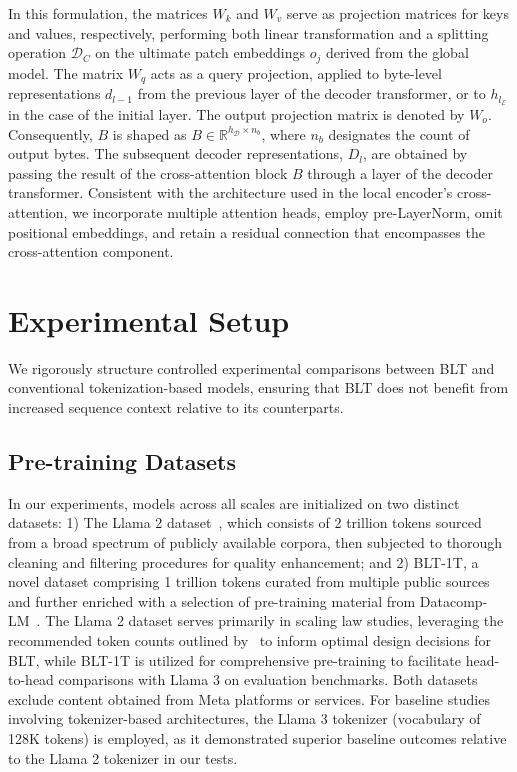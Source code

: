 In this formulation, the matrices $W_k$ and $W_v$ serve as projection matrices for keys and values, respectively, performing both linear transformation and a splitting operation $\mathcal{D}_C$ on the ultimate patch embeddings $o_j$ derived from the global model. The matrix $W_q$ acts as a query projection, applied to byte-level representations $d_{l-1}$ from the previous layer of the decoder transformer, or to $h_{l_{\mathcal{E}}}$ in the case of the initial layer. The output projection matrix is denoted by $W_o$. Consequently, $B$ is shaped as $B \in \mathbb{R}^{h_{\mathcal{D}} \times n_b}$, where $n_b$ designates the count of output bytes. The subsequent decoder representations, $D_l$, are obtained by passing the result of the cross-attention block $B$ through a layer of the decoder transformer. Consistent with the architecture used in the local encoder's cross-attention, we incorporate multiple attention heads, employ pre-LayerNorm, omit positional embeddings, and retain a residual connection that encompasses the cross-attention component.

\section{Experimental Setup}
\label{section:experiments}
We rigorously structure controlled experimental comparisons between {\textsc BLT} and conventional tokenization-based models, ensuring that {\textsc BLT} does not benefit from increased sequence context relative to its counterparts.

\subsection{Pre-training Datasets} In our experiments, models across all scales are initialized on two distinct datasets: 1) The Llama 2 dataset~\citep{touvron2023llama}, which consists of 2 trillion tokens sourced from a broad spectrum of publicly available corpora, then subjected to thorough cleaning and filtering procedures for quality enhancement; and 2) {\textsc BLT}-1T, a novel dataset comprising 1 trillion tokens curated from multiple public sources and further enriched with a selection of pre-training material from Datacomp-LM~\citep{li2024datacomp}. The Llama 2 dataset serves primarily in scaling law studies, leveraging the recommended token counts outlined by~\cite{dubey2024llama} to inform optimal design decisions for {\textsc BLT}, while {\textsc BLT}-1T is utilized for comprehensive pre-training to facilitate head-to-head comparisons with Llama 3 on evaluation benchmarks. Both datasets exclude content obtained from Meta platforms or services. For baseline studies involving tokenizer-based architectures, the Llama 3 tokenizer (vocabulary of 128K tokens) is employed, as it demonstrated superior baseline outcomes relative to the Llama 2 tokenizer in our tests.

